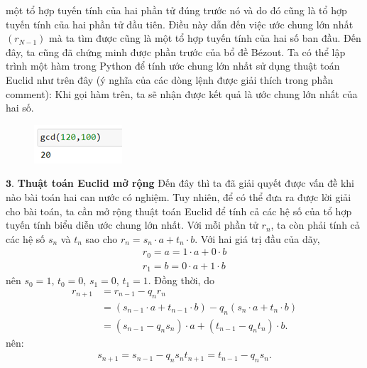	\begin{multicols}{2}
	một tổ hợp tuyến tính của hai phần tử đúng trước nó và do đó cũng là tổ hợp tuyến tính của hai phần tử đầu tiên. Điều này dẫn đến việc ước chung lớn nhất $(r_{N-1})$ mà ta tìm được cũng là một tổ hợp tuyến tính của hai số ban đầu. Đến đây, ta cũng đã chứng minh được phần trước của bổ đề Bézout.
	\vskip 0.1cm
	Ta có thể lập trình một hàm trong Python để tính ước chung lớn nhất sử dụng thuật toán Euclid như trên đây (ý nghĩa của các dòng lệnh được giải thích trong phần comment):
	\vskip 0.1cm
	Khi gọi hàm trên, ta sẽ nhận được kết quả là ước chung lớn nhất của hai số.
	\begin{figure}[H]
		\centering
		\vspace*{-10pt}
		\captionsetup{labelformat= empty, justification=centering}
		\includegraphics[width=0.4\linewidth]{3}
		\vspace*{-15pt}
	\end{figure}
	$\pmb{3.}$ \textbf{\color{hoccungpi}Thuật toán Euclid mở rộng}
	\vskip 0.1cm
	Đến đây thì ta đã giải quyết được vấn đề khi nào bài toán hai can nước có nghiệm. Tuy nhiên, để có thể đưa ra được lời giải cho bài toán, ta cần mở rộng thuật toán Euclid để tính cả các hệ số của tổ hợp tuyến tính biểu diễn ước chung lớn nhất. Với mỗi phần tử $r_n$, ta còn phải tính cả các hệ số $s_n$ và $t_n$ sao cho $r_n=s_n\cdot a+t_n\cdot b$.
	\vskip 0.1cm
	Với hai giá trị đầu của dãy,
	\begin{align*}
		r_0=a=1\cdot a+0\cdot b\\
		r_1=b=0\cdot a+1\cdot b
	\end{align*}
	nên $s_0=1$, $t_0=0$, $s_1=0$, $t_1=1$.
	\vskip 0.1cm
	Đồng thời, do
	\begin{align*}
		r_{n+1}&=r_{n-1}-q_n r_n\\
		&=\left(s_{n\!-\!1}\!\cdot\! a+t_{n-1}\!\cdot\! b\right)-q_n \left(s_n\!\cdot\! a+t_n\!\cdot \!b\right)\\
		&=\left(s_{n-1}-q_n s_n \right)\cdot a+\left(t_{n-1}-q_n t_n \right)\cdot b. 
	\end{align*}
	nên:
	\begin{align*}
		s_{n+1}=s_{n-1}-q_n s_n
		t_{n+1}=t_{n-1}-q_n s_n.
	\end{align*}

\end{multicols}
